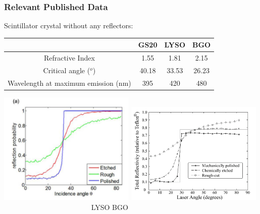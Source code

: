 \documentclass[xcolor=x11names, compress, handout]{beamer}
\renewcommand{\(}{\begin{columns}}
\renewcommand{\)}{\end{columns}}
\newcommand{\<}[1]{\begin{column}{#1}}
\renewcommand{\>}{\end{column}}
\begin{document}

\begin{frame}
\frametitle{Relevant Published Data}
\begin{block}{Scintillator crystal without any reflectors: }
\centering \scriptsize
\begin{tabular}{ c | c c c}
& GS20 & LYSO & BGO \\
\hline
Refractive Index & 1.55 & 1.81 & 2.15 \\
Critical angle ($^o$) & 40.18 & 33.53 & 26.23 \\ 
Wavelength at maximum emission (nm) & 395 & 420 & 480 \\
\end{tabular}
\end{block}

\includegraphics[width=0.49\textwidth, height=0.45\textheight]{images/LYSO_reflectivity_angular_distribution.png}
\includegraphics[width=0.49\textwidth, height=0.45\textheight]{images/BGO_reflectivity_angular_distribution.png}
\scriptsize \flushleft~~~~~~~~~~~~~~~~~~~~~~~~ LYSO \cite{roncali_stockhoff_cherry_2017} \hspace{5cm} BGO \cite{janecek_moses_2010} \hspace{3cm}
\end{frame}
\end{document}

